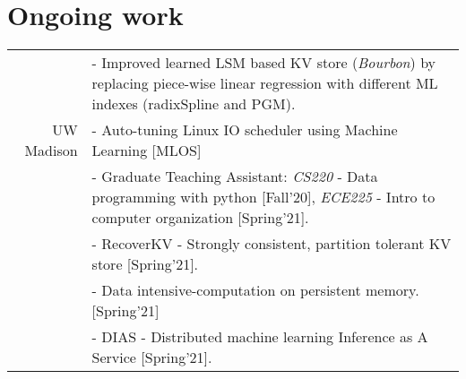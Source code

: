 \documentclass[a4paper,10pt]{article}
\begin{document}
\section{Ongoing work}
\begin{tabular}{r|p{11cm}}
& - Improved learned LSM based KV store (\emph{Bourbon}) by replacing piece-wise linear regression with different ML indexes (radixSpline and PGM).\\
UW Madison & - Auto-tuning Linux IO scheduler using Machine Learning [MLOS]\\
& - Graduate Teaching Assistant: \emph{CS220} - Data programming with python [Fall'20], \emph{ECE225} - Intro to computer organization [Spring'21]. \\
& - RecoverKV - Strongly consistent, partition tolerant KV store [Spring'21]. \\
& - Data intensive-computation on persistent memory. [Spring'21] \\
&- DIAS - Distributed machine learning Inference as A Service [Spring'21].

\end{tabular} 
\end{document}
